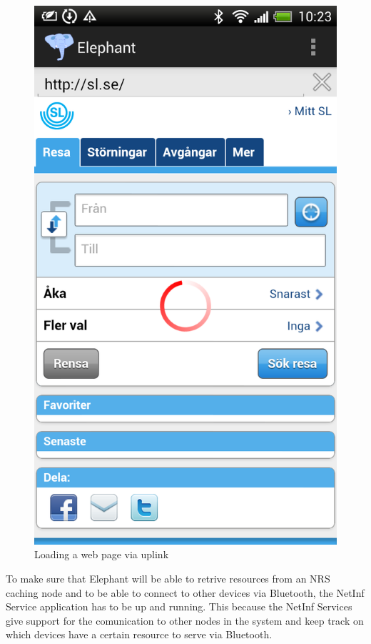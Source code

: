 \begin{figure}[!h]
\centering
\includegraphics[scale=0.2]{img/loaded_page.png}
\caption{Loading a web page via uplink}\label{fig:loaded_page}
\end{figure}

To make sure that Elephant will be able to retrive resources from an NRS caching node and to be able
to connect to other devices via Bluetooth, the NetInf Service application has to be up and running.
This because the NetInf Services give support for the comunication to other nodes in the system and keep
track on which devices have a certain resource to serve via Bluetooth.

